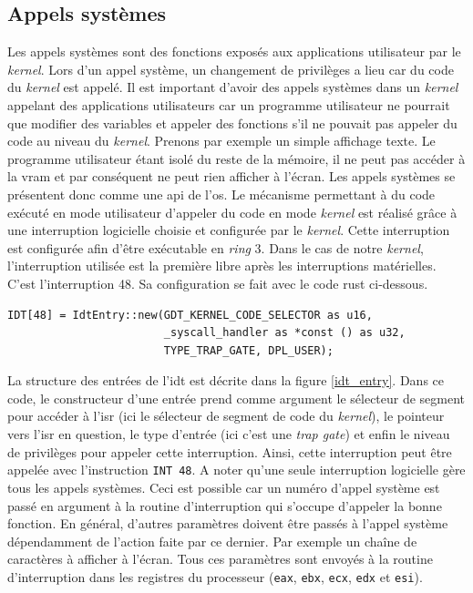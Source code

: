 \subsection{Appels systèmes}
Les appels systèmes sont des fonctions exposés aux applications utilisateur par
le \textit{kernel}. Lors d'un appel système, un changement de privilèges a lieu
car du code du \textit{kernel} est appelé. Il est important d'avoir des appels
systèmes dans un \textit{kernel} appelant des applications utilisateurs car
un programme utilisateur ne pourrait que modifier des variables et appeler des
fonctions s'il ne pouvait pas appeler du code au niveau du \textit{kernel}. Prenons
par exemple un simple affichage texte. Le programme utilisateur étant isolé du reste
de la mémoire, il ne peut pas accéder à la \acrshort{vram} et par conséquent ne
peut rien afficher à l'écran. Les appels systèmes se présentent donc comme une
\acrshort{api} de l'\acrshort{os}. Le mécanisme permettant à du code exécuté en
mode utilisateur d'appeler du code en mode \textit{kernel}
est réalisé grâce à une interruption logicielle choisie et configurée par le \textit{kernel}.
Cette interruption est configurée afin d'être exécutable en \textit{ring} 3.
Dans le cas de notre \textit{kernel}, l'interruption utilisée est la première libre
après les interruptions matérielles. C'est l'interruption 48. Sa configuration se
fait avec le code rust ci-dessous.

\begin{verbatim}
IDT[48] = IdtEntry::new(GDT_KERNEL_CODE_SELECTOR as u16,
                        _syscall_handler as *const () as u32,
                        TYPE_TRAP_GATE, DPL_USER);
\end{verbatim}

La structure des entrées de l'\acrshort{idt} est décrite dans la figure \ref{idt_entry}.
Dans ce code, le constructeur d'une entrée prend comme argument le sélecteur de
segment pour accéder à l'\acrshort{isr} (ici le sélecteur de segment de code du
\textit{kernel}), le pointeur vers l'\acrshort{isr} en question, le type d'entrée
(ici c'est une \textit{trap gate}) et enfin le niveau de privilèges pour appeler
cette interruption. Ainsi, cette interruption peut être appelée avec l'instruction
\texttt{INT 48}. A noter qu'une seule interruption logicielle gère tous
les appels systèmes. Ceci est possible car un numéro d'appel système est passé en
argument à la routine d'interruption qui s'occupe d'appeler la bonne fonction.
En général, d'autres paramètres doivent être passés à l'appel système dépendamment
de l'action faite par ce dernier. Par exemple un chaîne de caractères à afficher
à l'écran. Tous ces paramètres sont envoyés à la routine d'interruption dans les
registres du processeur (\texttt{eax}, \texttt{ebx}, \texttt{ecx},
\texttt{edx} et \texttt{esi}).

